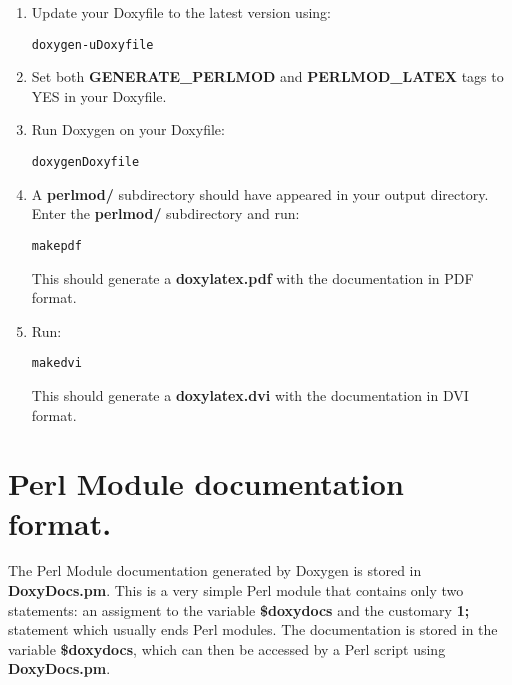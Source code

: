 \begin{enumerate}
\item Update your Doxyfile to the latest version using:

\small\begin{alltt}doxygen -u Doxyfile\end{alltt}
\normalsize 


\item Set both {\bf GENERATE\_\-PERLMOD} and {\bf PERLMOD\_\-LATEX} tags to YES in your Doxyfile.

\item Run Doxygen on your Doxyfile:

\small\begin{alltt}doxygen Doxyfile\end{alltt}
\normalsize 


\item A {\bf perlmod/} subdirectory should have appeared in your output directory. Enter the {\bf perlmod/} subdirectory and run:

\small\begin{alltt}make pdf\end{alltt}
\normalsize 




This should generate a {\bf doxylatex.pdf} with the documentation in PDF format.

\item Run:

\small\begin{alltt}make dvi\end{alltt}
\normalsize 




This should generate a {\bf doxylatex.dvi} with the documentation in DVI format.

\end{enumerate}
\hypertarget{perlmod_doxydocs_format}{}\section{Perl Module documentation format.}\label{perlmod_doxydocs_format}
The Perl Module documentation generated by Doxygen is stored in {\bf DoxyDocs.pm}. This is a very simple Perl module that contains only two statements: an assigment to the variable {\bf \$doxydocs} and the customary {\bf 1;} statement which usually ends Perl modules. The documentation is stored in the variable {\bf \$doxydocs}, which can then be accessed by a Perl script using {\bf DoxyDocs.pm}.

